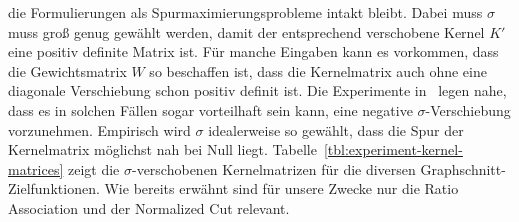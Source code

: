 die Formulierungen als Spurmaximierungsprobleme intakt bleibt. Dabei muss $\sigma$ muss groß genug gewählt werden, damit der
entsprechend verschobene Kernel $K'$ eine positiv definite Matrix ist. Für manche Eingaben kann es vorkommen, dass die
Gewichtsmatrix $W$ so beschaffen ist, dass die Kernelmatrix auch ohne eine diagonale Verschiebung schon positiv definit ist.
Die Experimente in~\cite{DhillonGK04,DhillonGK07} legen nahe, dass es in solchen Fällen sogar vorteilhaft sein kann, eine
negative $\sigma$-Verschiebung vorzunehmen. Empirisch wird $\sigma$ idealerweise so gewählt, dass die Spur der Kernelmatrix
möglichst nah bei Null liegt. Tabelle~\ref{tbl:experiment-kernel-matrices} zeigt die $\sigma$-verschobenen Kernelmatrizen
für die diversen Graphschnitt-Zielfunktionen. Wie bereits erwähnt sind für unsere Zwecke nur die Ratio Association und der
Normalized Cut relevant.
